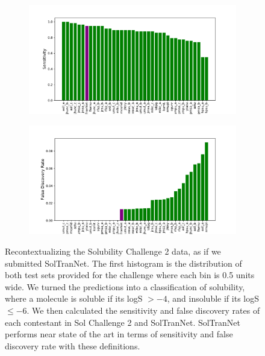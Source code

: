 \documentclass[journal=jmcmar,manuscript=article]{achemso}
\begin{document}
\begin{figure}[tb]
    \begin{subfigure}[t]{0.48\textwidth}
        \centering
        \includegraphics[width=\linewidth]{figures/hit_solchal2.pdf}
    \end{subfigure}%
    \hfill
    \begin{subfigure}[t]{0.48\textwidth}
        \centering
        \includegraphics[width=\linewidth]{figures/fail_solchal2.pdf}
    \end{subfigure}
    \caption{Recontextualizing the Solubility Challenge 2 data, as if we submitted SolTranNet. The first histogram is the distribution of both test sets provided for the challenge where each bin is 0.5 units wide. We turned the predictions into a classification of solubility, where a molecule is soluble if its logS $> -4$, and insoluble if its logS $\leq -6$. We then calculated the sensitivity and false discovery rates of each contestant in Sol Challenge 2 and SolTranNet. SolTranNet performs near state of the art in terms of sensitivity and false discovery rate with these definitions.}
    \label{fig:sc2redo}
\end{figure}

\end{document}
